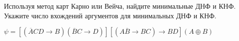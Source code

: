\question Используя метод карт Карно или Вейча, найдите минимальные ДНФ и КНФ. Укажите число вхождений аргументов для минимальных ДНФ и КНФ.

$\psi = [(\overline{A}CD \rightarrow B)(\overline{B}C \rightarrow D)][(A\overline{B} \rightarrow BC) \rightarrow BD](A \oplus B)$